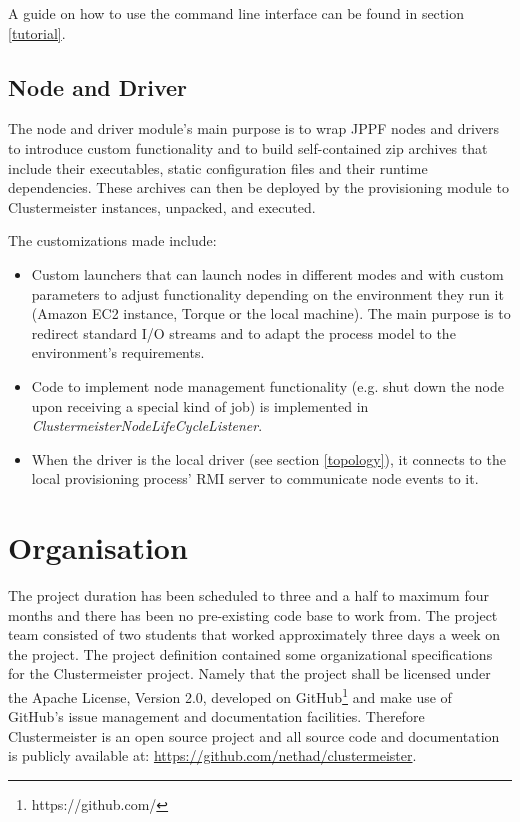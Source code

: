 \documentclass[english]{uzhpub}
\begin{document}
A guide on how to use the command line interface can be found in section \ref{tutorial}.

\subsection{Node and Driver}
The node and driver module's main purpose is to wrap JPPF nodes and drivers to introduce custom functionality and to build self-contained zip archives that include their executables, static configuration files and their runtime dependencies. These archives can then be deployed by the provisioning module to Clustermeister instances, unpacked, and executed.

The customizations made include:

\begin{itemize}
\item Custom launchers that can launch nodes in different modes and with custom parameters to adjust functionality depending on the environment they run it (Amazon EC2 instance, Torque or the local machine). The main purpose is to redirect standard I/O streams and to adapt the process model to the environment's requirements.
\item Code to implement node management functionality (e.g. shut down the node upon receiving a special kind of job) is implemented in \textit{ClustermeisterNodeLifeCycleListener}.
\item When the driver is the local driver (see section \ref{topology}), it connects to the local provisioning process' RMI server to communicate node events to it.
\end{itemize}

\section{Organisation}
\label{orga}
The project duration has been scheduled to three and a half to maximum four months and there has been no pre-existing code base to work from. The project team consisted of two students that worked approximately three days a week on the project. The project definition contained some organizational specifications for the Clustermeister project. Namely that the project shall be licensed under the Apache License, Version 2.0, developed on GitHub\footnote{https://github.com/} and make use of GitHub's issue management and documentation facilities. Therefore Clustermeister is an open source project and all source code and documentation is publicly available at: \url{https://github.com/nethad/clustermeister}.
\end{document}
